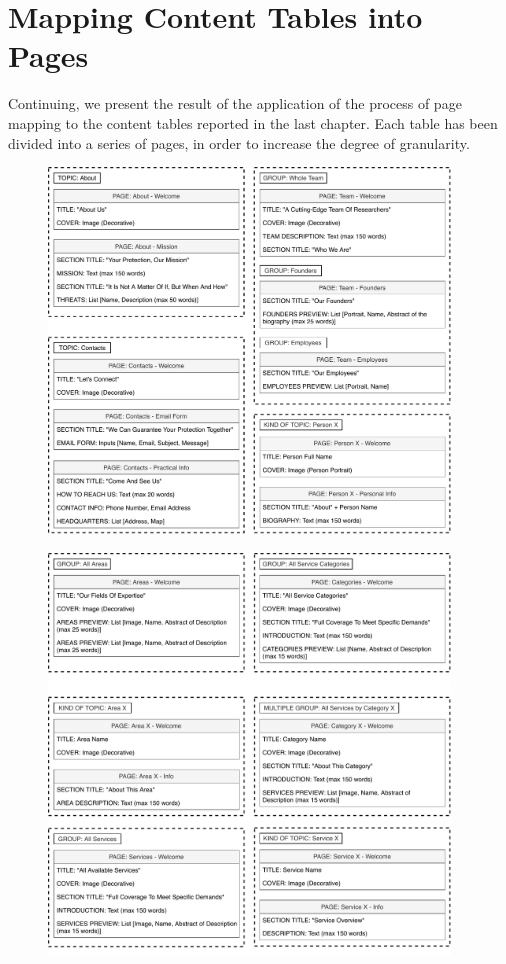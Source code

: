 \documentclass[12pt]{report}
\begin{document}
\chapter{Mapping Content Tables into Pages}
Continuing, we present the result of the application of the process of page mapping 
to the content tables reported in the last chapter. Each table has
been divided into a series of pages, in order to increase the degree of granularity.
\begin{figure}[H]
	\centering
	\includegraphics[width=0.95\textwidth]{page_mapping_pt1.pdf}
\end{figure}
\begin{figure}[H]
	\centering
	\includegraphics[width=0.95\textwidth]{page_mapping_pt2.pdf}
\end{figure}
\end{document}
